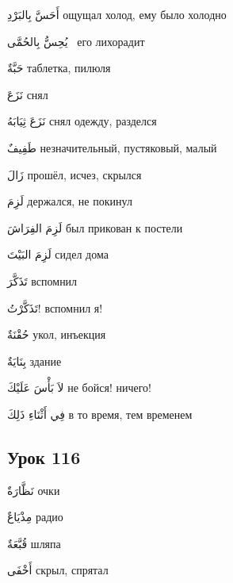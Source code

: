 \documentclass[a5paper]{article}
\newcommand\textstyleDropCaps[1]{#1}
\newcommand\textstyleCaptioncharacters[1]{#1}
\begin{document}
\textstyleCaptioncharacters{أَحَسَّ بِالبَرْدِ }\textstyleDropCaps{ощущал холод, ему было холодно‎}

\textstyleCaptioncharacters{يُحِسُّ بِالحُمَّى \ }\textstyleDropCaps{его ли­хорадит ‎}

\textstyleCaptioncharacters{حَبَّةٌ }\textstyleDropCaps{таблетка, пилюля ‎}

\textstyleCaptioncharacters{نَزَعَ }\textstyleDropCaps{снял‎}

\textstyleCaptioncharacters{نَزَعَ ثِيَابَهُ }\textstyleDropCaps{снял одежду, разделся‎}

\textstyleCaptioncharacters{طَفِيفٌ }\textstyleDropCaps{незначительный, пустяковый, малый‎}

\textstyleCaptioncharacters{زَالَ }\textstyleDropCaps{прошёл, исчез, скрыл­ся‎}

\textstyleCaptioncharacters{لَزِمَ }\textstyleDropCaps{держался, не покинул‎}

\textstyleCaptioncharacters{لَزِمَ الفِرَاشَ }\textstyleDropCaps{был прико­ван к постели‎}

\textstyleCaptioncharacters{لَزِمَ البَيْتَ }\textstyleDropCaps{сидел дома‎}

\textstyleCaptioncharacters{تَذَكَّرَ }\textstyleDropCaps{вспомнил‎}

\textstyleCaptioncharacters{تَذَكَّرْتُ! }\textstyleDropCaps{вспомнил я!‎}

\textstyleCaptioncharacters{حُقْنَةٌ }\textstyleDropCaps{укол, инъекция‎}

\textstyleCaptioncharacters{بِنَايَةٌ }\textstyleDropCaps{здание‎}

\textstyleCaptioncharacters{لاَ بَأْسَ عَلَيْكَ }\textstyleDropCaps{не бойся! ничего!‎}

\textstyleCaptioncharacters{فِي أَثْنَاءِ ذَلِكَ }\textstyleDropCaps{в то вре­мя, тем временем‎}

\subsection[Урок 116‎]{\textstyleDropCaps{Урок 116‎}}
\textstyleCaptioncharacters{نَظَّارَةٌ }\textstyleDropCaps{очки‎}

\textstyleCaptioncharacters{مِذْيَاعٌ }\textstyleDropCaps{радио‎}

\textstyleCaptioncharacters{قُبَّعَةٌ }\textstyleDropCaps{шляпа‎}

\textstyleCaptioncharacters{أَخْفَى }\textstyleDropCaps{скрыл, спрятал‎}
\end{document}
